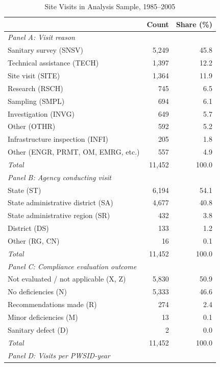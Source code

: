 \begin{table}[h!]
\centering
\caption{Site Visits in Analysis Sample, 1985--2005}
\label{tab:site_visits_profile}
\small
\begin{tabular}{lrr}
\hline\hline
 & \multicolumn{1}{c}{Count} & \multicolumn{1}{c}{Share (\%)} \\
\hline
\multicolumn{3}{l}{\textit{Panel A: Visit reason}} \\
Sanitary survey (SNSV) & 5,249 & 45.8 \\
Technical assistance (TECH) & 1,397 & 12.2 \\
Site visit (SITE) & 1,364 & 11.9 \\
Research (RSCH) & 745 & 6.5 \\
Sampling (SMPL) & 694 & 6.1 \\
Investigation (INVG) & 649 & 5.7 \\
Other (OTHR) & 592 & 5.2 \\
Infrastructure inspection (INFI) & 205 & 1.8 \\
Other (ENGR, PRMT, OM, EMRG, etc.) & 557 & 4.9 \\
\hline
\textit{Total} & 11,452 & 100.0 \\[6pt]
\multicolumn{3}{l}{\textit{Panel B: Agency conducting visit}} \\
State (ST) & 6,194 & 54.1 \\
State administrative district (SA) & 4,677 & 40.8 \\
State administrative region (SR) & 432 & 3.8 \\
District (DS) & 133 & 1.2 \\
Other (RG, CN) & 16 & 0.1 \\
\hline
\textit{Total} & 11,452 & 100.0 \\[6pt]
\multicolumn{3}{l}{\textit{Panel C: Compliance evaluation outcome}} \\
Not evaluated / not applicable (X, Z) & 5,830 & 50.9 \\
No deficiencies (N) & 5,333 & 46.6 \\
Recommendations made (R) & 274 & 2.4 \\
Minor deficiencies (M) & 13 & 0.1 \\
Sanitary defect (D) & 2 & 0.0 \\
\hline
\textit{Total} & 11,452 & 100.0 \\[6pt]
\multicolumn{3}{l}{\textit{Panel D: Visits per PWSID-year}} \\

\end{tabular}
\end{table}
